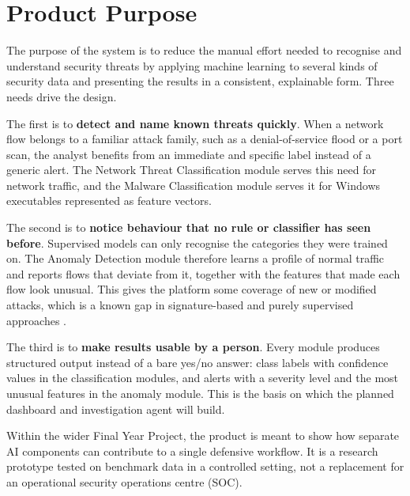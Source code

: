 \section{Product Purpose}

The purpose of the system is to reduce the manual effort needed to recognise and understand security threats by applying machine learning to several kinds of security data and presenting the results in a consistent, explainable form. Three needs drive the design.

The first is to \textbf{detect and name known threats quickly}. When a network flow belongs to a familiar attack family, such as a denial-of-service flood or a port scan, the analyst benefits from an immediate and specific label instead of a generic alert. The Network Threat Classification module serves this need for network traffic, and the Malware Classification module serves it for Windows executables represented as feature vectors.

The second is to \textbf{notice behaviour that no rule or classifier has seen before}. Supervised models can only recognise the categories they were trained on. The Anomaly Detection module therefore learns a profile of normal traffic and reports flows that deviate from it, together with the features that made each flow look unusual. This gives the platform some coverage of new or modified attacks, which is a known gap in signature-based and purely supervised approaches \cite{sommer2010outside}.

The third is to \textbf{make results usable by a person}. Every module produces structured output instead of a bare yes/no answer: class labels with confidence values in the classification modules, and alerts with a severity level and the most unusual features in the anomaly module. This is the basis on which the planned dashboard and investigation agent will build.

Within the wider Final Year Project, the product is meant to show how separate AI components can contribute to a single defensive workflow. It is a research prototype tested on benchmark data in a controlled setting, not a replacement for an operational security operations centre (SOC).
